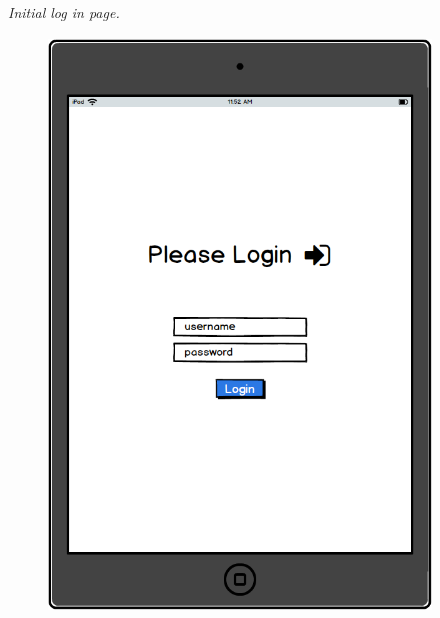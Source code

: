 \documentclass[twoside,letterpaper]{article}
\begin{document}
\newpage
{\itshape\color{black}
Initial log in page. 
}
\begin{figure}[H]
\centering
\renewcommand{\figurename}{Login}
\includegraphics[width=4in,height=6in]{mockup2.png}
\end{figure}
\end{document}
